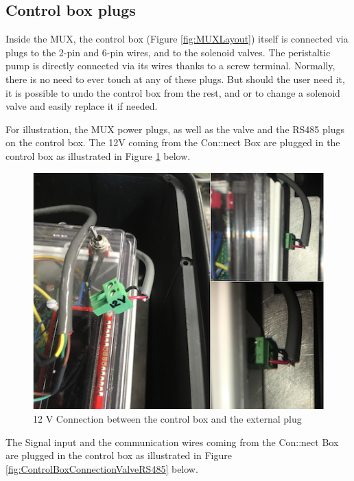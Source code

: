 \documentclass[]{book}
\begin{document}
\hypertarget{control-box-plugs}{%
\subsection{Control box plugs}\label{control-box-plugs}}

Inside the MUX, the control box (Figure \ref{fig:MUXLayout}) itself is connected via plugs to the 2-pin and 6-pin wires, and to the solenoid valves. The peristaltic pump is directly connected via its wires thanks to a screw terminal. Normally, there is no need to ever touch at any of these plugs. But should the user need it, it is possible to undo the control box from the rest, and or to change a solenoid valve and easily replace it if needed.

For illustration, the MUX power plugs, as well as the valve and the RS485 plugs on the control box. The 12V coming from the Con::nect Box are plugged in the control box as illustrated in Figure \ref{fig:ControlBoxConnection12V} below.

\begin{figure}

{\centering \includegraphics[width=0.8\linewidth]{pictures/ControlBoxConnection12V} 

}

\caption{12 V Connection between the control box and the external plug}\label{fig:ControlBoxConnection12V}
\end{figure}

The Signal input and the communication wires coming from the Con::nect Box are plugged in the control box as illustrated in Figure \ref{fig:ControlBoxConnectionValveRS485} below.
\end{document}
